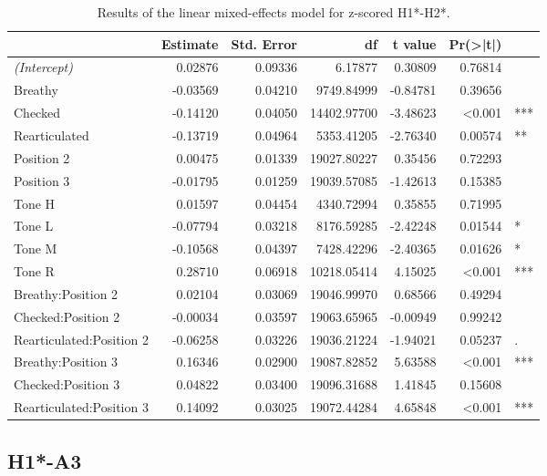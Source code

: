 \documentclass[12pt, letterpaper]{article}
\providecommand{\lsptoprule}{\midrule\toprule}
\providecommand{\lspbottomrule}{\bottomrule\midrule}
\begin{document}
\begin{table}[!h]
  \centering
  \caption{Results of the linear mixed-effects model for z-scored H1*-H2*.}
  \label{tab:H1H2Results}
  \begin{tabular}{lrrrrrl}
    \lsptoprule
      & Estimate & Std. Error & df & t value & Pr(>|t|) & \\ \hline
    \textit{(Intercept)} & 0.02876 & 0.09336 & 6.17877 & 0.30809 & 0.76814 & \\
    Breathy & -0.03569 & 0.04210 & 9749.84999 & -0.84781 & 0.39656 & \\
    Checked & -0.14120 & 0.04050 & 14402.97700 & -3.48623 & \textless 0.001 & ***\\
    Rearticulated & -0.13719 & 0.04964 & 5353.41205 & -2.76340 & 0.00574 & **\\
    Position 2 & 0.00475 & 0.01339 & 19027.80227 & 0.35456 & 0.72293 & \\
    Position 3 & -0.01795 & 0.01259 & 19039.57085 & -1.42613 & 0.15385 & \\
    Tone H & 0.01597 & 0.04454 & 4340.72994 & 0.35855 & 0.71995 & \\
    Tone L & -0.07794 & 0.03218 & 8176.59285 & -2.42248 & 0.01544 & *\\
    Tone M & -0.10568 & 0.04397 & 7428.42296 & -2.40365 & 0.01626 & *\\
    Tone R & 0.28710 & 0.06918 & 10218.05414 & 4.15025 & \textless 0.001 & ***\\
    Breathy:Position 2 & 0.02104 & 0.03069 & 19046.99970 & 0.68566 & 0.49294 & \\
    Checked:Position 2 & -0.00034 & 0.03597 & 19063.65965 & -0.00949 & 0.99242 & \\
    Rearticulated:Position 2 & -0.06258 & 0.03226 & 19036.21224 & -1.94021 & 0.05237 & .\\
    Breathy:Position 3 & 0.16346 & 0.02900 & 19087.82852 & 5.63588 & \textless 0.001 & ***\\
    Checked:Position 3 & 0.04822 & 0.03400 & 19096.31688 & 1.41845 & 0.15608 & \\
    Rearticulated:Position 3 & 0.14092 & 0.03025 & 19072.44284 & 4.65848 & \textless 0.001  & ***\\
    \lspbottomrule
  \end{tabular}
\end{table}

\subsection{H1*-A3} \label{sec:H1A3}
\end{document}
